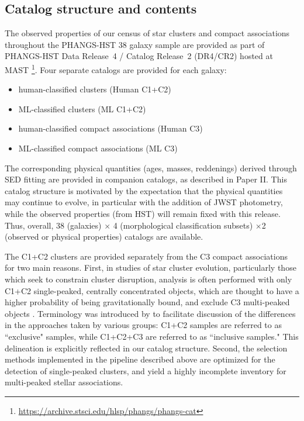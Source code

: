 \documentclass[linenumbers]{aastex63}
\begin{document}
\subsection{Catalog structure and contents}\label{ssect:cat_content}
The observed properties of our census of star clusters and compact associations throughout the PHANGS-HST 38 galaxy sample are provided as part of PHANGS-HST Data Release~4 / Catalog Release~2 (DR4/CR2) hosted at MAST
\footnote{\url{https://archive.stsci.edu/hlsp/phangs/phangs-cat}}.  Four separate catalogs are provided for each galaxy: 
\begin{itemize}
    \item human-classified clusters (Human C1+C2)
    \item ML-classified clusters (ML C1+C2)
    \item human-classified compact associations (Human C3)
    \item ML-classified compact associations (ML C3)
\end{itemize}
The corresponding physical quantities (ages, masses, reddenings) derived through SED fitting are provided in companion catalogs, as described in Paper II.  This catalog structure is motivated by the expectation that the physical quantities may continue to evolve, in particular with the addition of JWST photometry, while the observed properties (from HST) will remain fixed with this release. Thus, overall, 38 (galaxies) $\times$ 4 (morphological classification subsets) $ \times$2 (observed or physical properties) catalogs are available.


The C1+C2 clusters are provided separately from the C3 compact associations for two main reasons.  First, in studies of star cluster evolution, particularly those which seek to constrain cluster disruption, analysis is often performed with only C1+C2 single-peaked, centrally concentrated objects, which are thought to have a higher probability of being gravitationally bound, and exclude C3 multi-peaked objects \citep{bastian_stellar_2012, chandar_star-cluster_2014}.  Terminology was introduced by \citet{krumholz_star_2019} to facilitate discussion of the differences in the approaches taken by various groups: C1+C2 samples are referred to as ``exclusive" samples, while C1+C2+C3 are referred to as ``inclusive samples."  This delineation is explicitly reflected in our catalog structure. Second, the selection methods implemented in the pipeline described above are optimized for the detection of single-peaked clusters, and yield a highly incomplete inventory for multi-peaked stellar associations.  
\end{document}
